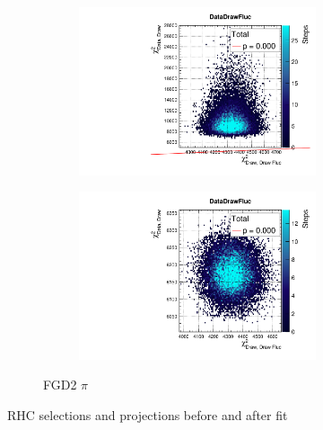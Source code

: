 \begin{figure}[h]
\begin{subfigure}[t]{\textwidth}
\begin{subfigure}[t]{0.24\textwidth}
			\includegraphics[width=\textwidth, trim={0mm 0mm 0mm 8mm}, clip,page=101]{figures/mach3/2018/data/2018a_FixedCov_RedCov_Mpi_Data_merge_PriorPred_procs}
		\end{subfigure}
		\begin{subfigure}[t]{0.24\textwidth}
			\includegraphics[width=\textwidth, trim={0mm 0mm 0mm 8mm}, clip,page=101]{figures/mach3/2018/data/2018a_FixedCov_RedCov_Mpi_Data_merge_PostPredStore_FullLLH_procs}
		\end{subfigure}
		\caption{FGD2 $\pi$}
	\end{subfigure}
	\caption{RHC selections \pmu and \cosmu projections before and after fit}
	\label{fig:fhc_postfit_0pi_1pi_nubar_2018}
\end{figure}


